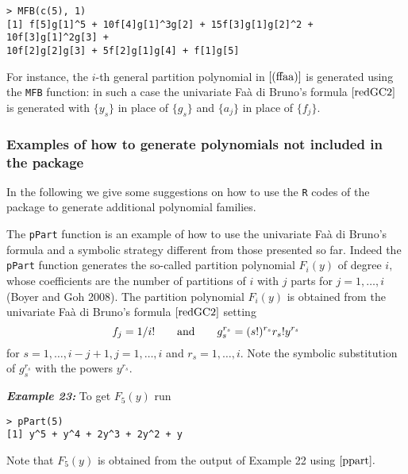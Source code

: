 \begin{verbatim}
> MFB(c(5), 1)
[1] f[5]g[1]^5 + 10f[4]g[1]^3g[2] + 15f[3]g[1]g[2]^2 + 10f[3]g[1]^2g[3] + 
10f[2]g[2]g[3] + 5f[2]g[1]g[4] + f[1]g[5]
\end{verbatim}

For instance, the \(i\)-th general partition polynomial in \(\eqref{(ffaa)}\) is generated using the \texttt{MFB} function: in such a case the univariate Faà di Bruno's formula \(\eqref{redGC2}\) is generated with \(\{y_s\}\) in place of \(\{g_s\}\) and \(\{a_j\}\) in place of \(\{f_j\}.\)

\hypertarget{examples-of-how-to-generate-polynomials-not-included-in-the-package}{%
\subsubsection{\texorpdfstring{Examples of how to generate polynomials not included in the  package}{Examples of how to generate polynomials not included in the  package}}\label{examples-of-how-to-generate-polynomials-not-included-in-the-package}}

In the following we give some suggestions on how to use the \texttt{R} codes of the  package to generate additional polynomial families.

The \texttt{pPart} function is an example of how to use the univariate Faà di Bruno's formula and a symbolic strategy different from those presented so far. Indeed the \texttt{pPart} function generates the so-called partition polynomial \(F_i(y)\) of degree \(i,\) whose coefficients are the number of partitions of \(i\) with \(j\) parts for \(j=1, \ldots, i\) (Boyer and Goh 2008). The partition polynomial \(F_i(y)\) is obtained from the univariate Faà di Bruno's formula \(\eqref{redGC2}\) setting
\begin{equation}
f_j = 1/i! \qquad \hbox{and} \qquad g_{s}^{r_s} =(s!)^{r_s} r_s! y^{r_s}
\label{ppart}
\end{equation}
for \(s=1, \ldots, i-j+1, j=1,\ldots,i\) and \(r_s=1, \ldots, i.\) Note the symbolic substitution of \(g_{s}^{r_s}\) with the powers \(y^{r_s}.\)

\hskip-0.5cm\textbf{\emph{Example 23:}} To get \(F_5(y)\) run

\begin{verbatim}
> pPart(5)
[1] y^5 + y^4 + 2y^3 + 2y^2 + y
\end{verbatim}

\noindent Note that \(F_5(y)\) is obtained from the output of Example 22 using \(\eqref{ppart}.\)

